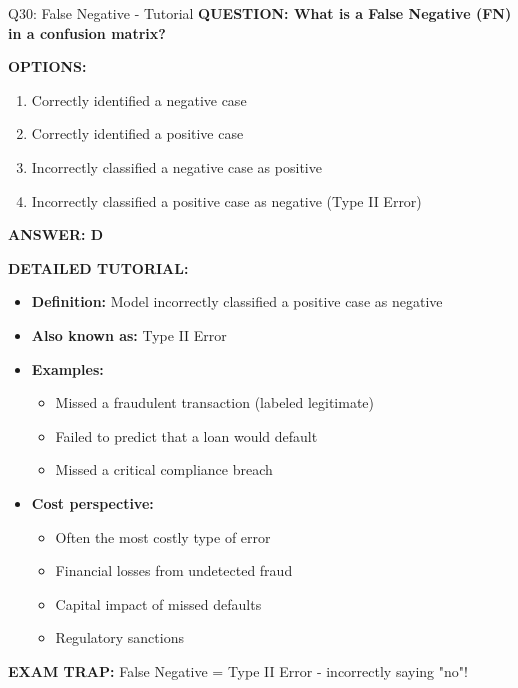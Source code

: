 \documentclass[8pt]{beamer}
\begin{document}
	\begin{frame}{Q30: False Negative - Tutorial}
		\fontsize{6.5}{7.5}\selectfont
		\textbf{QUESTION: What is a False Negative (FN) in a confusion matrix?}
		
		\vspace{0.1cm}
		\textbf{OPTIONS:}
		\begin{enumerate}
			\item Correctly identified a negative case
			\item Correctly identified a positive case
			\item Incorrectly classified a negative case as positive
			\item Incorrectly classified a positive case as negative (Type II Error)
		\end{enumerate}
		
		\vspace{0.1cm}
		\textcolor{myblue}{\textbf{ANSWER: D}}
		
		\vspace{0.1cm}
		\textbf{DETAILED TUTORIAL:}
		\begin{itemize}
			\item \textbf{Definition:} Model incorrectly classified a positive case as negative
			\item \textbf{Also known as:} Type II Error
			\item \textbf{Examples:}
			\begin{itemize}
				\item Missed a fraudulent transaction (labeled legitimate)
				\item Failed to predict that a loan would default
				\item Missed a critical compliance breach
			\end{itemize}
			\item \textbf{Cost perspective:}
			\begin{itemize}
				\item Often the most costly type of error
				\item Financial losses from undetected fraud
				\item Capital impact of missed defaults
				\item Regulatory sanctions
			\end{itemize}
		\end{itemize}
		
		\textcolor{myred}{\textbf{EXAM TRAP:}} False Negative = \textcolor{myblue}{Type II Error} - incorrectly saying "no"!
	\end{frame}
	
\end{document}
